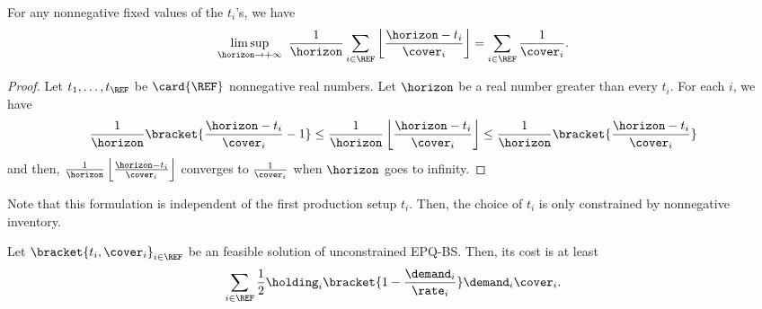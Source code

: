 \begin{lem}\label{lem:lot-size:deterministic:single-line:models:average-setup}
For any nonnegative fixed values of the $t_i$'s, we have
\begin{equation}
\limsup_{\horizon\rightarrow+\infty}\ \frac{1}{\horizon} \sum_{i\in\REF} \left\lfloor\frac{\horizon-t_i}{\cover_i}\right\rfloor
=
\sum_{i\in\REF} \frac{1}{\cover_i}.
\end{equation}
\end{lem}


\begin{proof}
Let $t_1,\ldots,t_{\REF}$ be $\card{\REF}$ nonnegative real numbers.
Let $\horizon$ be a real number greater than every $t_i$.
For each $i$, we have
\begin{equation}
\frac{1}{\horizon}\bracket{\frac{\horizon-t_i}{\cover_i}-1}
\le
\frac{1}{\horizon}\left\lfloor\frac{\horizon-t_i}{\cover_i}\right\rfloor
\le
\frac{1}{\horizon}\bracket{\frac{\horizon-t_i}{\cover_i}}
\end{equation}
and then, $\frac{1}{\horizon}\left\lfloor\frac{\horizon-t_i}{\cover_i}\right\rfloor$ converges to $\frac{1}{\cover_i}$ when $\horizon$ goes to infinity.
\end{proof}


Note that this formulation is independent of the first production setup $t_i$.
Then, the choice of $t_i$ is only constrained by nonnegative inventory.


\begin{lem}\label{lem:lot-size:deterministic:single-line:models:ZIO}
Let $\bracket{t_i,\cover_i}_{i\in\REF}$ be an feasible solution of unconstrained EPQ-BS.
Then, its cost is at least
\begin{equation}
  \sum_{i\in\REF}\frac{1}{2}\holding_i\bracket{1-\frac{\demand_i}{\rate_i}}\demand_i\cover_i.
\end{equation}
\end{lem}



